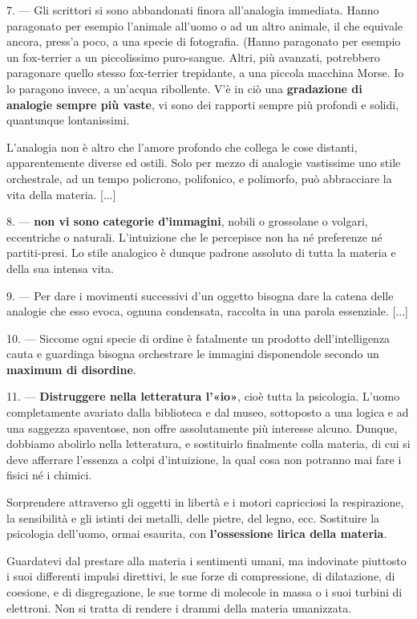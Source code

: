 \documentclass[a4paper, twoside, titlepage]{book}
\begin{document}
{7. — Gli scrittori si sono abbandonati finora all’analogia immediata. Hanno paragonato per esempio l’animale all’uomo o ad un altro animale, il che equivale ancora, press’a poco, a una specie di fotografia. (Hanno paragonato per esempio un fox-terrier a un piccolissimo puro-sangue. Altri, più avanzati, potrebbero paragonare quello stesso fox-terrier trepidante, a una piccola macchina Morse. Io lo paragono invece, a un’acqua ribollente. V’è in ciò una \textbf{gradazione di analogie sempre più vaste}, vi sono dei rapporti sempre più profondi e solidi, quantunque lontanissimi.

L’analogia non è altro che l’amore profondo che collega le cose distanti, apparentemente diverse ed ostili. Solo per mezzo di analogie vastissime uno stile orchestrale, ad un tempo policrono, polifonico, e polimorfo, può abbracciare la vita della materia. [...]

8. — \textbf{non vi sono categorie d’immagini}, nobili o grossolane o volgari, eccentriche o naturali. L’intuizione che le percepisce non ha né preferenze né partiti-presi. Lo stile analogico è dunque padrone assoluto di tutta la materia e della sua intensa vita.

9. — Per dare i movimenti successivi d’un oggetto bisogna dare la catena delle analogie che esso evoca, ognuna condensata, raccolta in una parola essenziale. [...]

10. — Siccome ogni specie di ordine è fatalmente un prodotto dell’intelligenza cauta e guardinga bisogna orchestrare le immagini disponendole secondo un \textbf{maximum di disordine}.

11. — \textbf{Distruggere nella letteratura l’«io»}, cioè tutta la psicologia. L’uomo completamente avariato dalla biblioteca e dal museo, sottoposto a una logica e ad una saggezza spaventose, non offre assolutamente più interesse alcuno. Dunque, dobbiamo abolirlo nella letteratura, e sostituirlo finalmente colla materia, di cui si deve afferrare l’essenza a colpi d’intuizione, la qual cosa non potranno mai fare i fisici né i chimici.

Sorprendere attraverso gli oggetti in libertà e i motori capricciosi la respirazione, la sensibilità e gli istinti dei metalli, delle pietre, del legno, ecc. Sostituire la psicologia dell’uomo, ormai esaurita, con \textbf{l’ossessione lirica della materia}.

Guardatevi dal prestare alla materia i sentimenti umani, ma indovinate piuttosto i suoi differenti impulsi direttivi, le sue forze di compressione, di dilatazione, di coesione, e di disgregazione, le sue torme di molecole in massa o i suoi turbini di elettroni. Non si tratta di rendere i drammi della materia umanizzata.

}
\end{document}
